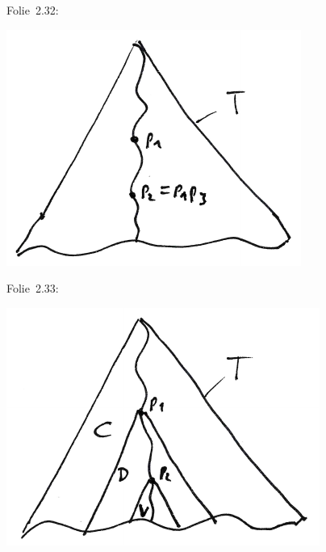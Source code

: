 \documentclass[fontsize=11pt, twoside=false, numbers=autoenddot]{scrbook}
\begin{document}
\begin{center}
  \parbox{.15\linewidth}{%
    Folie~2.32:%
  }%
  \parbox{.35\linewidth}{%
    \includegraphics[width=\linewidth]{img/t2_7a.pdf}%
  }%
  \parbox{.15\linewidth}{%
    Folie~2.33:%
  }%
  \parbox{.35\linewidth}{%
    \includegraphics[width=\linewidth]{img/t2_7b.pdf}%
  }%
\end{center}
%
\end{document}
